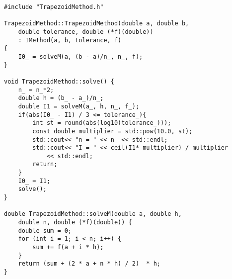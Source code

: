 \begin{lstlisting}
#include "TrapezoidMethod.h"

TrapezoidMethod::TrapezoidMethod(double a, double b,
    double tolerance, double (*f)(double)) 
    : IMethod(a, b, tolerance, f)
{
    I0_ = solveM(a, (b - a)/n_, n_, f);
}

void TrapezoidMethod::solve() {
    n_ = n_*2;
    double h = (b_ - a_)/n_;
    double I1 = solveM(a_, h, n_, f_);
    if(abs(I0_ - I1) / 3 <= tolerance_){
        int st = round(abs(log10(tolerance_)));
        const double multiplier = std::pow(10.0, st);
        std::cout<< "n = " << n_ << std::endl;
        std::cout<< "I = " << ceil(I1* multiplier) / multiplier
            << std::endl;
        return;
    }
    I0_ = I1;
    solve();
}

double TrapezoidMethod::solveM(double a, double h,
    double n, double (*f)(double)) {
    double sum = 0;
    for (int i = 1; i < n; i++) {
        sum += f(a + i * h);
    }
    return (sum + (2 * a + n * h) / 2)  * h;
}


\end{lstlisting}